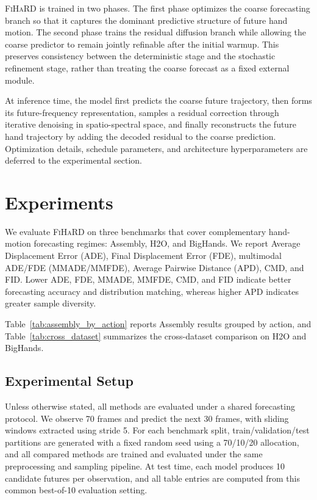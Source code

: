 \documentclass[runningheads]{llncs}
\newcommand{\modelname}{\textsc{FiHaRD}}
\begin{document}
\modelname{} is trained in two phases. The first phase optimizes the coarse forecasting branch so that it captures the dominant predictive structure of future hand motion. The second phase trains the residual diffusion branch while allowing the coarse predictor to remain jointly refinable after the initial warmup. This preserves consistency between the deterministic stage and the stochastic refinement stage, rather than treating the coarse forecast as a fixed external module.

At inference time, the model first predicts the coarse future trajectory, then forms its future-frequency representation, samples a residual correction through iterative denoising in spatio-spectral space, and finally reconstructs the future hand trajectory by adding the decoded residual to the coarse prediction. Optimization details, schedule parameters, and architecture hyperparameters are deferred to the experimental section.

\newcommand{\best}[1]{\textbf{#1}}
\newcommand{\second}[1]{\underline{#1}}

\section{Experiments}
\label{sec:experiments}

We evaluate \modelname{} on three benchmarks that cover complementary hand-motion forecasting regimes: Assembly, H2O, and BigHands. We report Average Displacement Error (ADE), Final Displacement Error (FDE), multimodal ADE/FDE (MMADE/MMFDE), Average Pairwise Distance (APD), CMD, and FID. Lower ADE, FDE, MMADE, MMFDE, CMD, and FID indicate better forecasting accuracy and distribution matching, whereas higher APD indicates greater sample diversity.

Table~\ref{tab:assembly_by_action} reports Assembly results grouped by action, and Table~\ref{tab:cross_dataset} summarizes the cross-dataset comparison on H2O and BigHands.

\subsection{Experimental Setup}
\label{sec:experimental_setup}

Unless otherwise stated, all methods are evaluated under a shared forecasting protocol. We observe 70 frames and predict the next 30 frames, with sliding windows extracted using stride 5. For each benchmark split, train/validation/test partitions are generated with a fixed random seed using a 70/10/20 allocation, and all compared methods are trained and evaluated under the same preprocessing and sampling pipeline. At test time, each model produces 10 candidate futures per observation, and all table entries are computed from this common best-of-10 evaluation setting.
\end{document}
